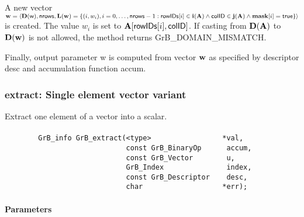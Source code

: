 A new vector ${\bf w} = \langle \bold{D}({\sf w}),{\sf nrows},
\bold{L}({\bf w}) = \{ (i,w_{i}), i = 0,\ldots,{\sf nrows}-1 : {\sf rowIDs}[i]
\in \bold{i}({\bf A}) \wedge {\sf colID} \in \bold{j}({\bf A}) \wedge {\bf mask}[i] = {\sf true} \} \rangle$
is created.  The value $w_{i}$ is set to ${\bf A}[{\sf rowIDs}[i],{\sf colID}]$. If
casting from $\bold{D}({\bf A})$ to $\bold{D}({\bf w})$ is not
allowed, the method returns {\sf GrB\_DOMAIN\_MISMATCH}.

Finally, output parameter {\sf w} is computed from vector ${\bf w}$ as
specified by descriptor {\sf desc} and accumulation function {\sf accum}.

\subsubsection{{\sf extract}: Single element vector variant}
\label{Sec:extract_single_element_vec}


Extract one element of a vector into a scalar. 

\paragraph{\syntax}

\begin{verbatim}
        GrB_info GrB_extract(<type>                 *val,
                             const GrB_BinaryOp      accum,
                             const GrB_Vector        u,
                             GrB_Index               index,
                             const GrB_Descriptor    desc,
                             char                   *err); 
\end{verbatim}

\paragraph{Parameters}

